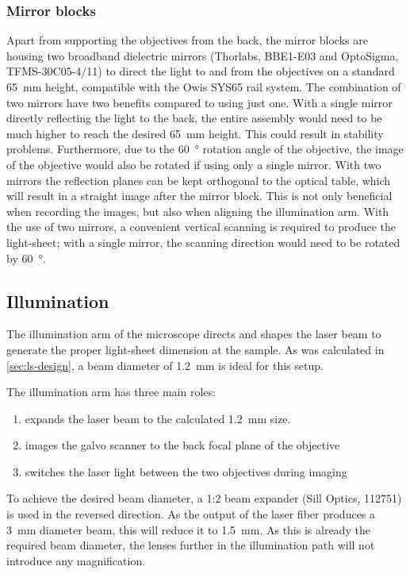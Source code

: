     \subsubsection{Mirror blocks}
    \label{sec:mirrors}
    Apart from supporting the objectives from the back, the mirror blocks are housing two broadband dielectric mirrors (Thorlabs, BBE1-E03 and OptoSigma, TFMS-30C05-4/11) to direct the light to and from the objectives on a standard \SI{65}{mm} height, compatible with the Owis SYS65 rail system. The combination of two mirrors have two benefits compared to using just one. With a single mirror directly reflecting the light to the back, the entire assembly would need to be much higher to reach the desired \SI{65}{mm} height. This could result in stability problems. Furthermore, due to the \SI{60}{\degree} rotation angle of the objective, the image of the objective would also be rotated if using only a single mirror. With two mirrors the reflection planes can be kept orthogonal to the optical table, which will result in a straight image after the mirror block. This is not only beneficial when recording the images, but also when aligning the illumination arm. With the use of two mirrors, a convenient vertical scanning is required to produce the light-sheet; with a single mirror, the scanning direction would need to be rotated by \SI{60}{\degree}.


  
    \subsection{Illumination}

    The illumination arm of the microscope directs and shapes the laser beam to generate the proper light-sheet dimension at the sample. As was calculated in \autoref{sec:ls-design}, a beam diameter of \SI{1.2}{mm} is ideal for this setup.

    The illumination arm has three main roles:
    \begin{enumerate}
      \item expands the laser beam to the calculated \SI{1.2}{mm} size.
      \item images the galvo scanner to the back focal plane of the objective
      \item switches the laser light between the two objectives during imaging
    \end{enumerate}

    To achieve the desired beam diameter, a 1:2 beam expander (Sill Optics, 112751) is used in the reversed direction. As the output of the laser fiber produces a \SI{3}{mm} diameter beam, this will reduce it to \SI{1.5}{mm}. As this is already the required beam diameter, the lenses further in the illumination path will not introduce any magnification.
    
